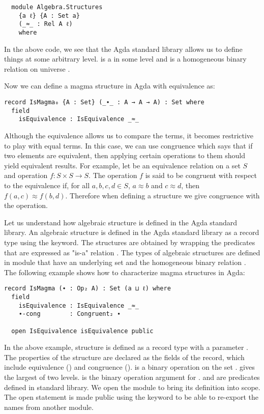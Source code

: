 \begin{verbatim}
  module Algebra.Structures
    {a ℓ} {A : Set a} 
    (_≈_ : Rel A ℓ)    
    where
  \end{verbatim} 

In the above code, we see that the Agda standard library allows us to define things at
some arbitrary level.  is a  in some level  and
 is a homogeneous binary relation  on universe .

Now we can define a magma structure in Agda with equivalence as:

\begin{verbatim}
record IsMagma₀ {A : Set} (_∙_ : A → A → A) : Set where
  field
    isEquivalence : IsEquivalence _≈_
\end{verbatim}

Although the equivalence allows us to compare the terms, it becomes restrictive
to play with equal terms. In this case, we can use congruence which says that if
two elements are equivalent, then applying certain operations to them should
yield equivalent results. For example, let  be an equivalence relation
on a set $S$ and operation $f: S × S → S$. The operation $f$ is said to be
congruent with respect to the equivalence if, for all $a, b, c, d \in S$, $a ≈
b$ and $c ≈ d$, then $f(a, c) ≈ f(b, d)$. Therefore when defining a structure we
give congruence with the operation.

Let us understand how algebraic structure is defined in the Agda standard library.
An algebraic structure is defined in the Agda standard library as a record type
using the  keyword. The structures are obtained by wrapping the
predicates that are expressed as "is-a" relation \cite{hu2021formalizing}. The
types of algebraic structures are defined in module 
that have an underlying set  and the homogeneous binary relation
. The following example shows how to characterize magma structures in
Agda:

\begin{verbatim}
record IsMagma (∙ : Op₂ A) : Set (a ⊔ ℓ) where
  field
    isEquivalence : IsEquivalence _≈_
    ∙-cong        : Congruent₂ ∙

  open IsEquivalence isEquivalence public
\end{verbatim}

In the above example, structure  is defined as a record type
with a parameter . The properties of the structure
 are declared as the fields of the record, which include
equivalence () and congruence ().
 is a binary operation on the set .  gives the
largest of two levels.  is the binary operation argument for
.  and  are
predicates defined in standard library. We open the module
 to bring its definition into scope. The open statement is
made public using the keyword  to be able to re-export the names
from another module.

